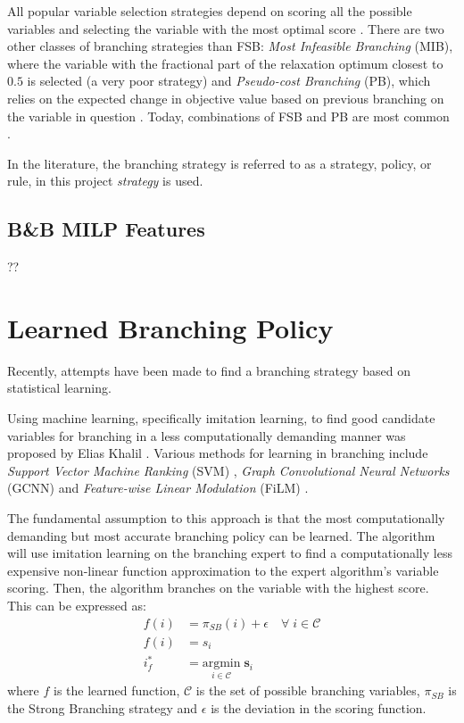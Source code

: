 All popular variable selection strategies depend on scoring all the possible variables and selecting the variable with the most optimal score \cite{achterberg2004branching}. There are two other classes of branching strategies than \gls{FSB}: \textit{Most Infeasible Branching} (\gls{MIB}), where the variable with the fractional part of the relaxation optimum closest to $0.5$ is selected (a very poor strategy) 
and \textit{Pseudo-cost Branching} (\gls{PB}), which relies on the expected change in objective value based on previous branching on the variable in question
\cite{achterberg2004branching}. Today, combinations of \gls{FSB} and \gls{PB} are most common \cite{anand2017comparative}.   

In the literature, the branching strategy is referred to as a strategy, policy, or rule, in this project \textit{strategy} is used.  

\subsection{B\&B MILP Features}
??






\section{Learned Branching Policy}

Recently, attempts have been made to find a branching strategy based on statistical learning. 

Using machine learning, specifically imitation learning, to find good candidate variables for branching in a less computationally demanding manner was proposed by Elias Khalil \cite{khalil2016learning}. Various methods for learning in branching include \textit{ Support Vector Machine Ranking} (\Gls{SVM}) \cite{khalil2016learning}, \textit{Graph Convolutional Neural Networks} (\gls{GCNN}) \cite{gasse2019exact} and \textit{Feature-wise Linear Modulation} (\gls{FiLM}) \cite{gupta2020hybrid}.

The fundamental assumption to this approach is that the most computationally demanding but most accurate branching policy can be learned. The algorithm will use imitation learning on the branching expert to find a computationally less expensive non-linear function approximation to the expert algorithm's variable scoring. Then, the algorithm branches on the variable with the highest score. This can be expressed as: 
\begin{align}
    f(i) &=  \pi_{SB} (i) + \epsilon \quad \forall \; i \in \mathcal{C}\\
    f(i) &= s_i\\
    i^*_f &= \underset{i \in \mathcal{C}}{\mathrm{argmin}} \; \bm{s}_i
\end{align}
where $f$ is the learned function, $\mathcal{C}$ is the set of possible branching variables, $\pi_{SB}$ is the Strong Branching strategy and $\epsilon$ is the deviation in the scoring function. 



